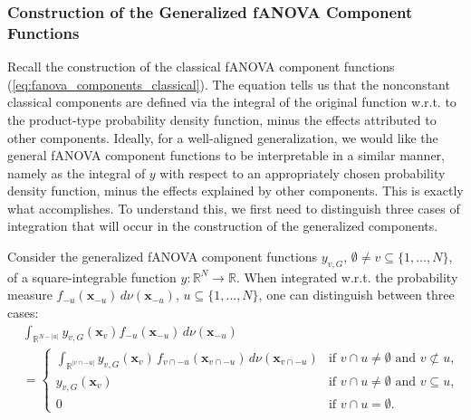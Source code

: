 \subsubsection{Construction of the Generalized fANOVA Component Functions}
Recall the construction of the classical fANOVA component functions (\autoref{eq:fanova_components_classical}). The equation tells us that the nonconstant classical components are defined via the integral of the original function w.r.t. to the product-type probability density function, minus the effects attributed to other components.
Ideally, for a well-aligned generalization, we would like the general fANOVA component functions 
to be interpretable in a similar manner, namely as the integral of $y$ with respect to an 
appropriately chosen probability density function, minus the effects explained by other components. This is exactly what \cite{rahman2014} accomplishes.
To understand this, we first need to distinguish three cases of integration that will occur in the construction of the generalized components.
\begin{proposition}\label{prop:generalized_fanova_integration_cases}
Consider the generalized fANOVA component functions $y_{v,G}$, $\emptyset \ne v \subseteq \{1,\dots,N\}$, of a square-integrable function $y : \mathbb{R}^N \to \mathbb{R}$. When integrated w.r.t. the probability measure $f_{-u}(\boldsymbol{x}_{-u})\, d \nu(\boldsymbol{x}_{-u})$, $u \subseteq \{1,\dots,N\}$, one can distinguish between three cases:
\begin{equation}
\begin{aligned}
& \int_{\mathbb{R}^{N - |u|}} y_{v,G}(\boldsymbol{x}_v) 
    f_{-u}(\boldsymbol{x}_{-u}) \, d \nu(\boldsymbol{x}_{-u}) \\[0.5em]
&= 
\begin{cases}
    \displaystyle 
    \int_{\mathbb{R}^{|v \cap -u|}} 
        y_{v,G}(\boldsymbol{x}_v)\,
        f_{v \cap -u}(\boldsymbol{x}_{v \cap -u})\,
        d \nu(\boldsymbol{x}_{v \cap -u}) 
        & \text{if } v \cap u \ne \emptyset \text{ and } v \not\subset u, \\[1ex]
    y_{v,G}(\boldsymbol{x}_v) 
        & \text{if } v \cap u \ne \emptyset \text{ and } v \subseteq u, \\[1ex]
    0 
        & \text{if } v \cap u = \emptyset.
\end{cases}
\end{aligned}
\end{equation}
\end{proposition}
